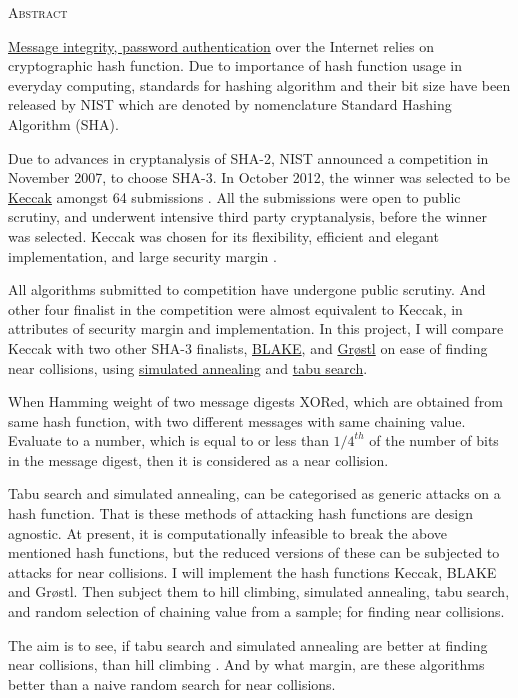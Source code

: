 \documentclass[12pt]{artikel3}                  %
\begin{document}
\begin{center}
\parbox{350pt}{
  \begin{center}\textsc{Abstract}\end{center}
  \vspace{0.5cm}
  \href{"http://en.wikipedia.org/wiki/Cryptographic\_hash\_function\#Applications"}
  {Message integrity, password authentication} over the Internet relies on cryptographic hash
  function. Due to importance of hash function usage in everyday computing, standards for hashing 
  algorithm and their bit size have been released by NIST \cite{00037} which are 
  denoted by nomenclature Standard Hashing Algorithm (SHA).

  Due to advances in cryptanalysis of SHA-2, NIST announced a competition in November 2007, 
  to choose SHA-3. In October 2012, the winner was selected to be \href{"http://keccak.noekeon.org/"}
  {Keccak} amongst 64 submissions \cite{00038, 00039}. All the submissions were open to public scrutiny, 
  and underwent intensive third party cryptanalysis, before the winner was selected. 
  Keccak was chosen for its flexibility, efficient and elegant implementation, and large security 
  margin \cite{00040}.

  All algorithms submitted to competition have undergone public scrutiny. And other four finalist in 
  the competition were almost equivalent to Keccak, in attributes of security margin and implementation.
  In this project, I will compare Keccak with two other SHA-3 finalists, \href{"https://131002.net/blake/"}
  {BLAKE}, and \href{"http://www.groestl.info/"}{Gr{\o}stl} on ease of finding near collisions, using
  \href{"http://en.wikipedia.org/wiki/Simulated\_annealing"}{simulated annealing} and 
  \href{"http://en.wikipedia.org/wiki/Tabu\_search"}{tabu search}.
  
  When Hamming weight of two message digests XORed, which are obtained from same hash function, with two
  different messages with same chaining value. Evaluate to a number, which is equal to or less than 
  ${1/4}^{th}$ of the number of bits in the message digest, then it is considered as a near collision.
  
  Tabu search and simulated annealing, can be categorised as generic attacks on a hash function. That is
  these methods of attacking hash functions are design agnostic. At present, it is computationally 
  infeasible to break the above mentioned hash functions, but the reduced versions of these can be 
  subjected to attacks for near collisions. I will implement the hash functions Keccak, BLAKE and
  Gr{\o}stl. Then subject them to hill climbing, simulated annealing, tabu search, and random selection 
  of chaining value from a sample; for finding near collisions.
  
  The aim is to see, if tabu search and simulated annealing are better at finding near collisions, than
  hill climbing \cite{00029}. And by what margin, are these algorithms better than a naive random search
  for near collisions.
}
\end{center}
\end{document}
